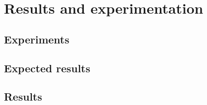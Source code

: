 
\chapter{Results and experimentation}\label{chapter:results}
	
	\section{Experiments}

	\section{Expected results}
	
	\section{Results}